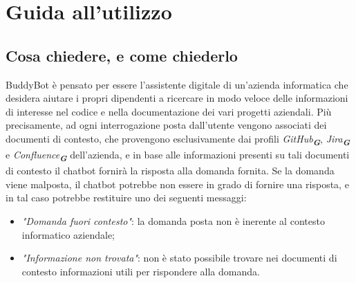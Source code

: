 
\section{Guida all’utilizzo}
\label{sec:guida_utilizzo}


\subsection{Cosa chiedere, e come chiederlo}
\label{subsec:cosa_come_chiedere}

BuddyBot è pensato per essere l'assistente digitale di un'azienda informatica che desidera aiutare i propri dipendenti a ricercare in
modo veloce delle informazioni di interesse nel codice e nella documentazione dei vari progetti aziendali. Più precisamente, ad
ogni interrogazione posta dall'utente vengono associati
dei documenti di contesto, che provengono esclusivamente dai profili \emph{GitHub}\textsubscript{\textbf{\textit{G}}},
\emph{Jira}\textsubscript{\textbf{\textit{G}}} e \emph{Confluence}\textsubscript{\textbf{\textit{G}}} dell'azienda, e in base alle
informazioni presenti su tali documenti di contesto il chatbot fornirà la risposta alla domanda fornita.
Se la domanda viene malposta, il chatbot potrebbe non essere in grado di fornire una risposta, e in tal caso potrebbe restituire
uno dei seguenti messaggi:
\begin{itemize}
    \item \emph{"Domanda fuori contesto"}: la domanda posta non è inerente al contesto informatico aziendale;
    \item \emph{"Informazione non trovata"}: non è stato possibile trovare nei documenti di contesto informazioni utili per rispondere
    alla domanda.
\end{itemize}


